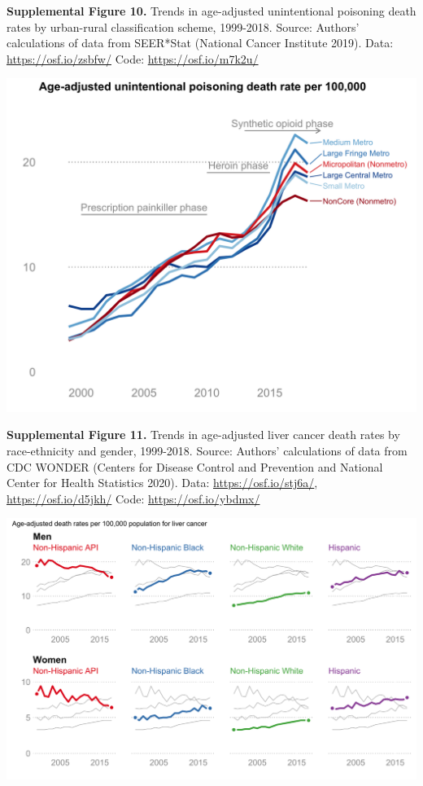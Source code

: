 \documentclass[
  11pt,
]{article}
\begin{document}
\newpage

\textbf{Supplemental Figure 10.} Trends in age-adjusted unintentional
poisoning death rates by urban-rural classification scheme, 1999-2018.
Source: Authors' calculations of data from SEER*Stat (National Cancer
Institute 2019). Data: \url{https://osf.io/zsbfw/} Code:
\url{https://osf.io/m7k2u/}

\includegraphics[width=1\linewidth]{../figures/rural-upoison-trends}

\newpage

\textbf{Supplemental Figure 11.} Trends in age-adjusted liver cancer
death rates by race-ethnicity and gender, 1999-2018. Source: Authors'
calculations of data from CDC WONDER (Centers for Disease Control and
Prevention and National Center for Health Statistics 2020). Data:
\url{https://osf.io/stj6a/}, \url{https://osf.io/d5jkh/} Code:
\url{https://osf.io/ybdmx/}

\includegraphics[width=1\linewidth]{../figures/liverca-race-trends}
\end{document}
